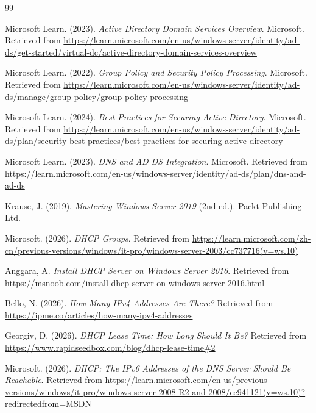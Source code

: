 \documentclass[12pt,a4paper]{report}
\begin{document}
\newpage
\begin{thebibliography}{99}

Microsoft Learn. (2023). \textit{Active Directory Domain Services Overview}. Microsoft. Retrieved from \url{https://learn.microsoft.com/en-us/windows-server/identity/ad-ds/get-started/virtual-dc/active-directory-domain-services-overview}

Microsoft Learn. (2022). \textit{Group Policy and Security Policy Processing}. Microsoft. Retrieved from \url{https://learn.microsoft.com/en-us/windows-server/identity/ad-ds/manage/group-policy/group-policy-processing}

Microsoft Learn. (2024). \textit{Best Practices for Securing Active Directory}. Microsoft. Retrieved from \url{https://learn.microsoft.com/en-us/windows-server/identity/ad-ds/plan/security-best-practices/best-practices-for-securing-active-directory}

Microsoft Learn. (2023). \textit{DNS and AD DS Integration}. Microsoft. Retrieved from \url{https://learn.microsoft.com/en-us/windows-server/identity/ad-ds/plan/dns-and-ad-ds}

Krause, J. (2019). \textit{Mastering Windows Server 2019} (2nd ed.). Packt Publishing Ltd.

Microsoft. (2026). \textit{DHCP Groups}. Retrieved from \url{https://learn.microsoft.com/zh-cn/previous-versions/windows/it-pro/windows-server-2003/cc737716(v=ws.10)}

Anggara, A. \textit{Install DHCP Server on Windows Server 2016}. Retrieved from \url{https://msnoob.com/install-dhcp-server-on-windows-server-2016.html}

Bello, N. (2026). \textit{How Many IPv4 Addresses Are There?} Retrieved from \url{https://ipme.co/articles/how-many-ipv4-addresses}

Georgiv, D. (2026). \textit{DHCP Lease Time: How Long Should It Be?} Retrieved from \url{https://www.rapidseedbox.com/blog/dhcp-lease-time#2}

Microsoft. (2026). \textit{DHCP: The IPv6 Addresses of the DNS Server Should Be Reachable}. Retrieved from \url{https://learn.microsoft.com/en-us/previous-versions/windows/it-pro/windows-server-2008-R2-and-2008/ee941121(v=ws.10)?redirectedfrom=MSDN}


\end{thebibliography}
\end{document}
